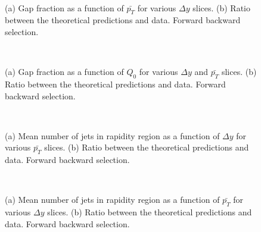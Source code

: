 \begin{figure}
\centering
\mbox{
              \quad
              \quad
}
\caption[Gap fraction as a function of $\bar{p_T}$ for forward backward selection]{ (a) Gap fraction as a function of $\bar{p_T}$ for various $\Delta y$ slices. (b) Ratio between the theoretical predictions and data. Forward backward selection.
\label{GBJ1:pTSelB}}
\end{figure}

\begin{figure}
\centering
\mbox{
              \quad
              \quad
}
\caption[Gap fraction as a function of $Q_0$ for forward backward selection]{ (a) Gap fraction as a function of $Q_0$ for various $\Delta y$ and $\bar{p_T}$ slices. (b) Ratio between the theoretical predictions and data. Forward backward selection.
\label{GBJ1:Q0SelB}}
\end{figure}


\begin{figure}
\centering
\mbox{
              \quad
              \quad
}
\caption[Mean number of jets as a function of $\Delta y$ for forward backward selection ]{ (a) Mean number of jets in rapidity region as a function of $\Delta y$ for various $\bar{p_T}$ slices. (b) Ratio between the theoretical predictions and data. Forward backward selection.
\label{GBJ1:nJetsdYSelB}}
\end{figure}

\begin{figure}
\centering
\mbox{
              \quad
              \quad
}
\caption[Mean number of jets as a function of $\Delta y$ for forward backward selection]{ (a) Mean number of jets in rapidity region as a function of $\bar{p_T}$ for various $\Delta y$ slices. (b) Ratio between the theoretical predictions and data. Forward backward selection.
\label{GBJ1:nJetspTSelB}}
\end{figure}


